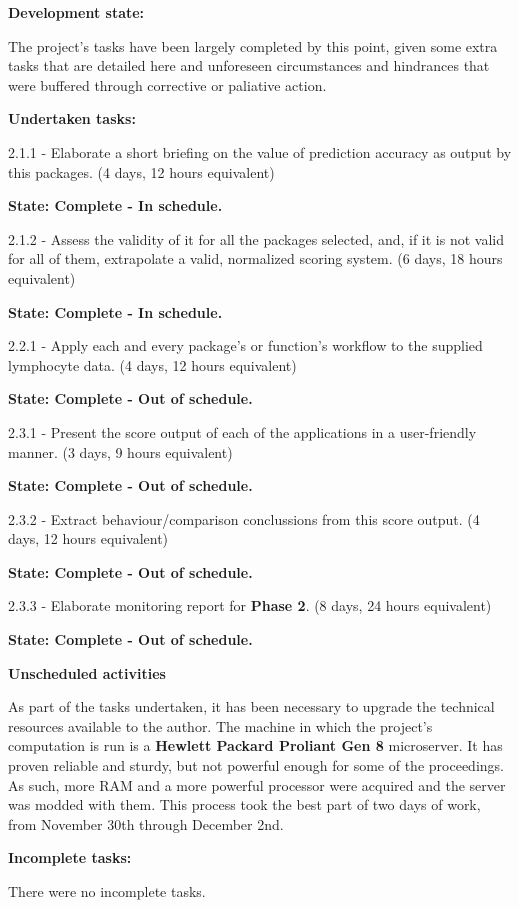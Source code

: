 \documentclass[]{article}
\begin{document}
\textbf{Development state:}

The project's tasks have been largely completed by this point, given
some extra tasks that are detailed here and unforeseen circumstances and
hindrances that were buffered through corrective or paliative action.

\textbf{Undertaken tasks:}

2.1.1 - Elaborate a short briefing on the value of prediction accuracy
as output by this packages. (4 days, 12 hours equivalent)

\textbf{State: Complete - In schedule.}

2.1.2 - Assess the validity of it for all the packages selected, and, if
it is not valid for all of them, extrapolate a valid, normalized scoring
system. (6 days, 18 hours equivalent)

\textbf{State: Complete - In schedule.}

2.2.1 - Apply each and every package's or function's workflow to the
supplied lymphocyte data. (4 days, 12 hours equivalent)

\textbf{State: Complete - Out of schedule.}

2.3.1 - Present the score output of each of the applications in a
user-friendly manner. (3 days, 9 hours equivalent)

\textbf{State: Complete - Out of schedule.}

2.3.2 - Extract behaviour/comparison conclussions from this score
output. (4 days, 12 hours equivalent)

\textbf{State: Complete - Out of schedule.}

2.3.3 - Elaborate monitoring report for \textbf{Phase 2}. (8 days, 24
hours equivalent)

\textbf{State: Complete - Out of schedule.}

\textbf{Unscheduled activities}

As part of the tasks undertaken, it has been necessary to upgrade the
technical resources available to the author. The machine in which the
project's computation is run is a \textbf{Hewlett Packard Proliant Gen
8} microserver. It has proven reliable and sturdy, but not powerful
enough for some of the proceedings. As such, more RAM and a more
powerful processor were acquired and the server was modded with them.
This process took the best part of two days of work, from November 30th
through December 2nd.

\textbf{Incomplete tasks:}

There were no incomplete tasks.
\end{document}
